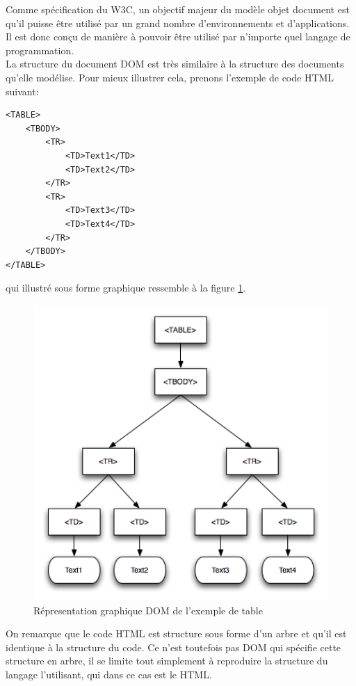 \documentclass[10pt,a4paper,titlepage]{article}
\begin{document}
Comme spécification du W3C, un objectif majeur du modèle objet document est qu'il puisse être utilisé par un grand nombre d'environnements et d'applications. Il est donc conçu de manière à pouvoir être utilisé par n'importe quel langage de programmation.\\

La structure du document DOM est très similaire à la structure des documents qu'elle modélise. Pour mieux illustrer cela, prenons l'exemple de code HTML suivant:

\begin{lstlisting}
<TABLE>
	<TBODY> 
		<TR> 
			<TD>Text1</TD>
			<TD>Text2</TD> 
		</TR> 
		<TR>
			<TD>Text3</TD>        
			<TD>Text4</TD> 
		</TR> 
	</TBODY>
</TABLE>
\end{lstlisting}

qui illustré sous forme graphique ressemble à la figure \ref{dom1}.

\begin{figure}[h]
	\begin{center}
			\includegraphics[width=12cm]{img/exempleDOM.png}
			\caption{Répresentation graphique DOM de l'exemple de table}
			\label{dom1}
	\end{center}
\end{figure}

On remarque que le code HTML est structure sous forme d'un arbre et qu'il est identique à la structure du code. Ce n'est toutefois pas DOM qui spécifie cette structure en arbre, il se limite tout simplement à reproduire la structure du langage l'utilisant, qui dans ce cas est le HTML.
\end{document}
